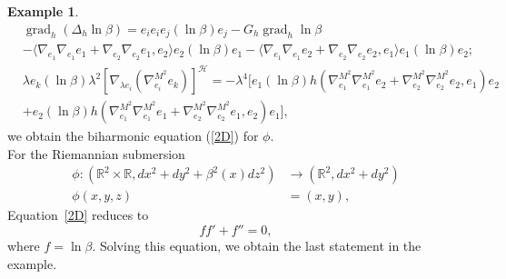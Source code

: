 \documentclass[12pt]{amsart}
\theoremstyle{plain}
\theoremstyle{definition}
\newtheorem{ex}{Example}
\begin{document}
\begin{ex}
\begin{align*}
&\operatorname{grad}_{h} (\Delta_{h} \ln\beta) = e_{i}e_{i}e_{j}(\ln\beta)e_{j} - G_h \operatorname{grad}_{h}\ln\beta\\
&- \langle \nabla_{e_{1}}\nabla_{e_{1}}e_{1}+ \nabla_{e_{2}}\nabla_{e_{2}}e_{1}
,e_{2}\rangle e_{2}(\ln\beta)e_{1}
 - \langle \nabla_{e_{1}}\nabla_{e_{1}}e_{2} + \nabla_{e_{2}}\nabla_{e_{2}}e_{2}
,e_{1}\rangle e_{1}(\ln\beta) e_{2} ;\\
& \lambda e_{k}(\ln\beta)\lambda^2 [\nabla_{\lambda e_i}(\nabla^{M^2}_{e_i}e_k)]^{\mathcal{H}}
= -\lambda^4 [ e_{1}(\ln\beta) h(\nabla^{M^2}_{e_1}\nabla^{M^2}_{e_1}e_2
+ \nabla^{M^2}_{e_2}\nabla^{M^2}_{e_2}e_2,e_1) e_2 \\
&+ e_{2}(\ln\beta) h(\nabla^{M^2}_{e_1}\nabla^{M^2}_{e_1}e_1 +
\nabla^{M^2}_{e_2}\nabla^{M^2}_{e_2}e_1,e_2) e_1 ],
\end{align*}
we obtain the biharmonic equation (\ref{2D}) for $\phi$.\\

For the Riemannian submersion
\begin{align*}
\phi : ({{\mathbb R}}^2 \times {{\mathbb R}} , dx^2 + dy^2 + \beta^2(x) dz^2) &\to ({{\mathbb R}}^2 , dx^2 + dy^2)\\
\phi(x,y,z) &= (x,y) ,
\end{align*}
Equation~\eqref{2D} reduces to
$$ ff' + f'' =0 ,$$
where $f = \ln \beta$. Solving this equation, we obtain the last statement in the
example.
\end{ex}
\end{document}
